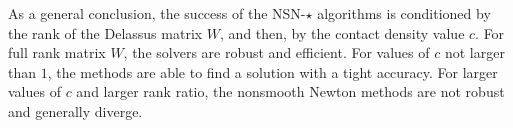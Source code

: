As a general conclusion, the success of the {\sf NSN-$\star$} algorithms is conditioned by  the rank of the Delassus matrix $W$, and then, by the contact density value $c$. For full rank matrix $W$, the solvers are robust and efficient. For values of $c$ not larger than $1$, the methods are able to find a solution with a tight accuracy. For larger values of $c$ and larger rank ratio, the nonsmooth Newton methods are not robust and generally diverge.

\begin{figure}
  \centering
    \subfiglayout
  \\

\end{figure}
